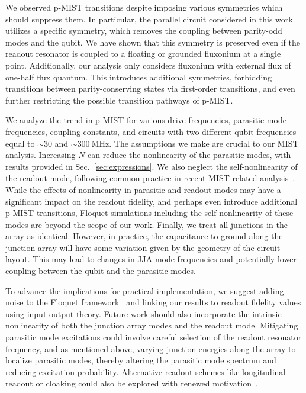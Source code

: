 \documentclass[%
reprint,
superscriptaddress,
 amsmath,amssymb,
 aps,
 prx,
longbibliography,
floatfix,
]{revtex4-2}
\begin{document}
We observed p-MIST transitions despite imposing various symmetries which should suppress them. In particular, the parallel circuit considered in this work utilizes a specific symmetry, which removes the coupling between parity-odd modes and the qubit. We have shown that this symmetry is preserved even if the readout resonator is coupled to a floating or grounded fluxonium at a single point. Additionally, our analysis only considers fluxonium with external flux of one-half flux quantum. This introduces additional symmetries, forbidding transitions between parity-conserving states via first-order transitions, and even further restricting the possible transition pathways of p-MIST.

We analyze the trend in p-MIST for various drive frequencies, parasitic mode frequencies, coupling constants, and circuits with two different qubit frequencies equal to $\sim 30$ and $\sim 300 \ \mathrm{MHz}$. The assumptions we make are crucial to our MIST analysis. Increasing $N$ can reduce the nonlinearity of the parasitic modes, with results provided in Sec.~\ref{sec:expressions}. We also neglect the self-nonlinearity of the readout mode, following common practice in recent MIST-related analysis~\cite{shillito2022dynamics,dumas2024unified,cohen2023reminiscence}. While the effects of nonlinearity in parasitic and readout modes may have a significant impact on the readout fidelity, and perhaps even introduce additional p-MIST transitions, Floquet simulations including the self-nonlinearity of these modes are beyond the scope of our work. Finally, we treat all junctions in the array as identical. However, in practice, the capacitance to ground along the junction array will have some variation given by the geometry of the circuit layout. This may lead to changes in JJA mode frequencies and potentially lower coupling between the qubit and the parasitic modes. 


To advance the implications for practical implementation, we suggest adding noise to the Floquet framework~\cite{huang_engineering_2021} and linking our results to readout fidelity values using input-output theory. Future work should also incorporate the intrinsic nonlinearity of both the junction array modes and the readout mode. Mitigating parasitic mode excitations could involve careful selection of the readout resonator frequency, and as mentioned above, varying junction energies along the array to localize parasitic modes, thereby altering the parasitic mode spectrum and reducing excitation probability. Alternative readout schemes like longitudinal readout or cloaking could also be explored with renewed motivation~\cite{reed_high-fidelity_2010, munoz-arias_qubit_2023, didier_fast_2015}. 
\end{document}
